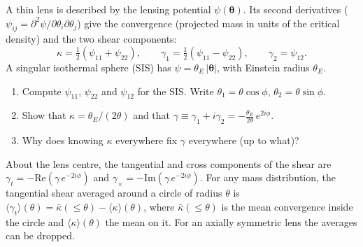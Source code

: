 
\begin{given}
A thin lens is described by the lensing potential $\psi(\bm\theta)$. Its second derivatives
($\psi_{ij} = \partial^2\psi/\partial\theta_i\partial\theta_j$) give the convergence (projected mass in units of the
critical density) and the two shear components:
\[
\kappa = \tfrac12(\psi_{11} + \psi_{22}),\qquad
\gamma_1 = \tfrac12(\psi_{11} - \psi_{22}),\qquad
\gamma_2 = \psi_{12}.
\]
A singular isothermal sphere (SIS) has $\psi = \theta_E\,|\bm\theta|$, with Einstein radius $\theta_E$.
\end{given}


\begin{enumerate}
  \item Compute $\psi_{11}$, $\psi_{22}$ and $\psi_{12}$ for the SIS. Write $\theta_1 = \theta\cos\phi$,
    $\theta_2 = \theta\sin\phi$.
  \item Show that $\kappa = \theta_E/(2\theta)$ and that $\gamma \equiv \gamma_1 + i\gamma_2 = -\frac{\theta_E}{2\theta}\,e^{2i\phi}$.
  \item Why does knowing $\kappa$ everywhere fix $\gamma$ everywhere (up to what)?
\end{enumerate}



\begin{given}
About the lens centre, the tangential and cross components of the shear are
$\gamma_t = -\mathrm{Re}(\gamma\,e^{-2i\phi})$ and $\gamma_\times = -\mathrm{Im}(\gamma\,e^{-2i\phi})$.
For any mass distribution, the tangential shear averaged around a circle of radius $\theta$ is
$\langle\gamma_t\rangle(\theta) = \bar\kappa(\le\theta) - \langle\kappa\rangle(\theta)$, where $\bar\kappa(\le\theta)$ is
the mean convergence inside the circle and $\langle\kappa\rangle(\theta)$ the mean on it. For an axially symmetric lens
the averages can be dropped.
\end{given}

